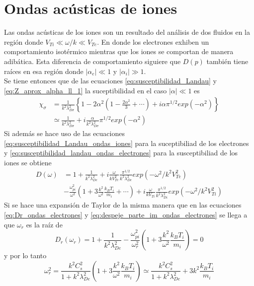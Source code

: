 \documentclass[../tesis_main_file.tex]{subfiles}
\begin{document}
\section{Ondas acústicas de iones}
Las ondas acústicas de los iones son un resultado del análisis de dos fluidos en la región donde $V_{Ti} \ll \omega /k \ll V_{Te}$. En donde los electrones exhiben un comportamiento isotérmico mientras que los iones se comportan de manera adibática.
Esta diferencia de comportamiento siguiere que $D(p)$ también tiene raíces en esa región donde $|\alpha _e|\ll 1$ y $|\alpha _i|\gg 1$.\\
Se tiene entonces que de las ecuaciones \ref{eq:susceptibilidad_Landau} y \ref{eq:Z_aprox_alpha_ll_1} la suceptibilidad en el caso $|\alpha | \ll 1$ es
\begin{equation}
\label{eq:susceptibilidad_Landau_ondas_iones}
\begin{split}
\chi _{\sigma} &= \frac{1}{k^2\lambda^2_{D\sigma}}\left\lbrace 1-2\alpha^2 \left(1-\frac{2\alpha^2}{3}+\cdots \right) + i\alpha \pi^{1/2}exp(-\alpha^2)\right\rbrace \\
&\simeq \frac{1}{k^2\lambda^2_{D\sigma}}+i\frac{\alpha}{k^2\lambda^2_{D\sigma}}\pi^{1/2}exp(-\alpha^2)
\end{split}
\end{equation}
Si además se hace uso de las ecuaciones \ref{eq:susceptibilidad_Landau_ondas_iones} para la suceptibiliad de los electrones y \ref{eq:susceptibilidad_landau_ondas_electrones} para la susceptibiliad de los iones se obtiene
\begin{equation}
\begin{split}
D(\omega) &= 1+\frac{1}{k^2 \lambda^2_{De}}+i\frac{\omega}{kV^2_{Te}}\frac{\pi^{1/2}}{k^2\lambda^2_{De}}exp(-\omega^2/k^2V^2_{Te})\\
&-\frac{\omega^2_{pi}}{\omega^2}\left(1+3\frac{k^2}{\omega^2}\frac{k_BT_i}{m_i}+\cdots \right)+i\frac{\omega}{kV_{Ti}}\frac{\pi^{1/2}}{k^2\lambda^2_{Di}}exp(-\omega^2/k^2V^2_{Ti})
\end{split}
\end{equation}
Si se hace una expansión de Taylor de la misma manera que en las ecuaciones \ref{eq:Dr_ondas_electrones} y \ref{eq:despeje_parte_im_ondas_electrones} se llega a que $\omega_r$ es la raíz de 
\begin{equation}
D_r(\omega_r)=1+\frac{1}{k^2\lambda^2_{De}}-\frac{\omega^2_{pi}}{\omega^2_r}\left(1+3\frac{k^2}{\omega^2}\frac{k_BT_i}{m_i}\right)=0
\end{equation}
y por lo tanto
\begin{equation}
\omega^2_r =\frac{k^2 C^2_s}{1+k^2\lambda^2_{De}}\left(1+3\frac{k^2}{\omega^2}\frac{k_BT_i}{m_i}\right)\simeq\frac{k^2C^2_s}{1+k^2\lambda^2_{De}}+3k^2\frac{k_BT_i}{m_i}
\end{equation}
\end{document}
